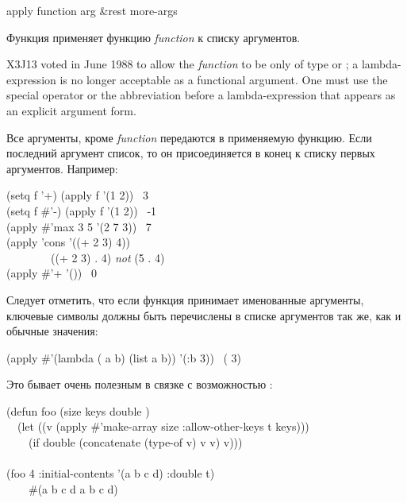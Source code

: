 \begin{defun}[Функция]
apply function arg &rest more-args

Функция применяет функцию \emph{function} к списку аргументов.

\begin{newer}
X3J13 voted in June 1988  to allow the \emph{function}
to be only of type  or ; a lambda-expression
is no longer acceptable as a functional argument.  One must use the
 special operator or the abbreviation  before
a lambda-expression that appears as an  explicit argument form.
\end{newer}

Все аргументы, кроме \emph{function} передаются в применяемую функцию.
Если последний аргумент список, то он присоединяется в конец к списку первых
аргументов. Например:
\begin{lisp}
(setq f '+) (apply f '(1 2)) \EV\ 3 \\
(setq f \#'-) (apply f '(1 2)) \EV\ -1 \\
(apply \#'max 3 5 '(2 7 3)) \EV\ 7 \\
(apply 'cons '((+ 2 3) 4)) {\EV} \\
~~~~~~~~((+ 2 3) . 4)	\emph{not} (5 . 4) \\
(apply \#'+ '()) \EV\ 0
\end{lisp}
Следует отметить, что если функция принимает именованные аргументы, ключевые
символы должны быть перечислены в списке аргументов так же, как и обычные
значения:
\begin{lisp}
(apply \#'(lambda ( a b) (list a b)) '(:b 3)) \EV\ ({\nil} 3)
\end{lisp}
Это бывает очень полезным в связке с возможностью :
\begin{lisp}
(defun foo (size  keys  double ) \\
~~(let ((v (apply \#'make-array size :allow-other-keys t keys))) \\
~~~~(if double (concatenate (type-of v) v v) v))) \\
 \\
(foo 4 :initial-contents '(a b c d) :double t) \\
~~~\EV\ \#(a b c d a b c d)
\end{lisp}
\end{defun}

